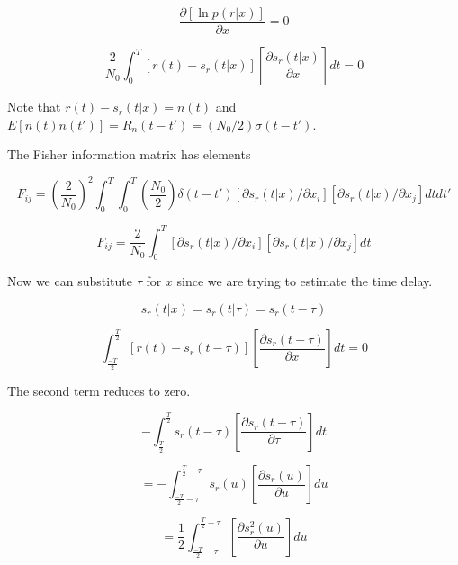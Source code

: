 \documentclass[11pt]{article}
\begin{document}
\begin{equation}
\frac{\partial \left[ \ln p(r|x) \right]}{\partial x}
= 0
\end{equation}

\begin{equation}
\frac{2}{N_0} \int^T_0 \left[ r(t) - s_r(t|x)\right]
\left[ \frac{\partial s_r(t|x)}{\partial x} \right] dt = 0
\end{equation}

Note that $r(t) - s_r(t|x) = n(t)$ and $E[n(t)n(t')]=R_n(t-t')=(N_0/2)\sigma(t-t')$.

The Fisher information matrix has elements

\begin{equation}
F_{ij}
=
\left( \frac{2}{N_0} \right)^2
\int^T_0 \int^T_0
\left( \frac{N_0}{2} \right)
\delta (t - t')
\left[ \partial s_r(t|x)/\partial x_i \right]
\left[ \partial s_r(t|x)/\partial x_j \right]
dt dt'
\end{equation}

\begin{equation}
F_{ij}
=
\frac{2}{N_0}
\int^T_0
\left[ \partial s_r(t|x)/\partial x_i \right]
\left[ \partial s_r(t|x)/\partial x_j \right]
dt
\end{equation}

Now we can substitute $\tau$ for $x$ since we are trying to estimate the time delay.

\begin{equation}
s_r(t|x) = s_r(t|\tau) = s_r(t-\tau)
\end{equation}


\begin{equation}
\int^\frac{T}{2}_\frac{-T}{2}
 \left[ r(t) - s_r(t-\tau)\right]
\left[ \frac{\partial s_r(t-\tau)}{\partial x} \right] dt = 0
\end{equation}

The second term reduces to zero.

\begin{equation}
- \int^\frac{T}{2}_\frac{T}{2}
s_r(t-\tau)
\left[ \frac{\partial s_r(t-\tau)}{\partial \tau} \right] dt
\end{equation}


\begin{equation}
=-\int^{\frac{T}{2}-\tau}_{\frac{-T}{2}-\tau}
s_r(u)
\left[ \frac{\partial s_r(u)}{\partial u} \right] du
\end{equation}

\begin{equation}
=\frac{1}{2} \int^{\frac{T}{2}-\tau}_{\frac{-T}{2}-\tau}
\left[ \frac{\partial s_r^2(u)}{\partial u} \right] du
\end{equation}
\end{document}
